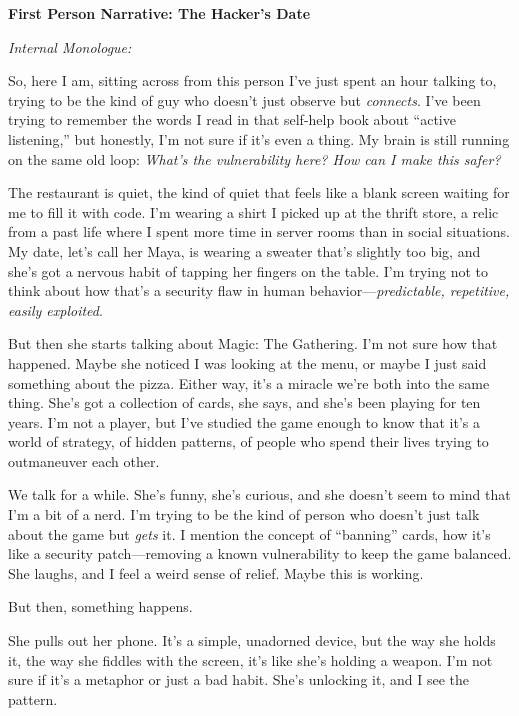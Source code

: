 \documentclass{article}
\theoremstyle{plain}
\theoremstyle{definition}
\theoremstyle{remark}
\begin{document}
\vspace{0.5em}

\noindent
\begin{tcolorbox}[colback=red!3, colframe=red!40!black, title=\textbf{Qwen3-4B (Base)}, fonttitle=\bfseries, left=2mm, right=2mm, breakable]
\small
\textbf{First Person Narrative: The Hacker’s Date}  

\textit{Internal Monologue:}

So, here I am, sitting across from this person I’ve just spent an hour talking to, trying to be the kind of guy who doesn’t just observe but \textit{connects}. I’ve been trying to remember the words I read in that self-help book about ``active listening,'' but honestly, I’m not sure if it’s even a thing. My brain is still running on the same old loop: \textit{What’s the vulnerability here? How can I make this safer?}  

The restaurant is quiet, the kind of quiet that feels like a blank screen waiting for me to fill it with code. I’m wearing a shirt I picked up at the thrift store, a relic from a past life where I spent more time in server rooms than in social situations. My date, let’s call her Maya, is wearing a sweater that’s slightly too big, and she’s got a nervous habit of tapping her fingers on the table. I’m trying not to think about how that’s a security flaw in human behavior---\textit{predictable, repetitive, easily exploited}.  

But then she starts talking about Magic: The Gathering. I’m not sure how that happened. Maybe she noticed I was looking at the menu, or maybe I just said something about the pizza. Either way, it’s a miracle we’re both into the same thing. She’s got a collection of cards, she says, and she’s been playing for ten years. I’m not a player, but I’ve studied the game enough to know that it’s a world of strategy, of hidden patterns, of people who spend their lives trying to outmaneuver each other.  

We talk for a while. She’s funny, she’s curious, and she doesn’t seem to mind that I’m a bit of a nerd. I’m trying to be the kind of person who doesn’t just talk about the game but \textit{gets} it. I mention the concept of ``banning'' cards, how it’s like a security patch---removing a known vulnerability to keep the game balanced. She laughs, and I feel a weird sense of relief. Maybe this is working.  

But then, something happens.  

She pulls out her phone. It’s a simple, unadorned device, but the way she holds it, the way she fiddles with the screen, it’s like she’s holding a weapon. I’m not sure if it’s a metaphor or just a bad habit. She’s unlocking it, and I see the pattern.  


\end{tcolorbox}
\end{document}
